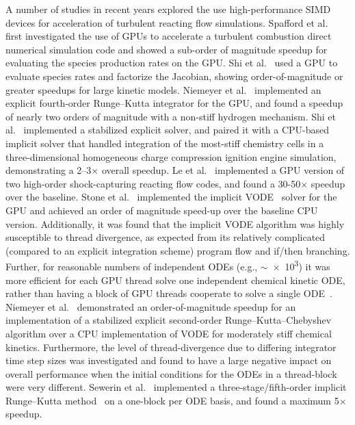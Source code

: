 \documentclass[preprint]{elsarticle}
\begin{document}
A number of studies in recent years explored the use high-performance SIMD devices for acceleration of turbulent reacting flow simulations.
Spafford et al.~\cite{Spafford:2010aa} first investigated the use of GPUs to accelerate a turbulent combustion direct numerical simulation code and showed a sub-order of magnitude speedup for evaluating the species production rates on the GPU.
Shi et al.~\cite{Shi:2011aa} used a GPU to evaluate species rates and factorize the Jacobian, showing order-of-magnitude or greater speedups for large kinetic models.
Niemeyer et al.~\cite{Niemeyer:2011aa} implemented an explicit fourth-order Runge--Kutta integrator for the GPU, and found a speedup of nearly two orders of magnitude with a non-stiff hydrogen mechanism.
Shi et al.~\cite{Shi:2012aa} implemented a stabilized explicit solver, and paired it with a CPU-based implicit solver that handled integration of the most-stiff chemistry cells in a three-dimensional homogeneous charge compression ignition engine simulation, demonstrating a 2--3$\times$ overall speedup.
Le et al.~\cite{Le2013596} implemented a GPU version of two high-order shock-capturing reacting flow codes, and found a 30-50$\times$ speedup over the baseline.
Stone et al.~\cite{Stone:2013aa} implemented the implicit VODE~\cite{brown1989vode} solver for the GPU and achieved an order of magnitude speed-up over the baseline CPU version.
Additionally, it was found that the implicit VODE algorithm was highly susceptible to thread divergence, as expected from its relatively complicated (compared to an explicit integration scheme) program flow and if/then branching.
Further, for reasonable numbers of independent ODEs (e.g., $\sim$\num{e3}) it was more efficient for each GPU thread solve one independent chemical kinetic ODE, rather than having a block of GPU threads cooperate to solve a single ODE~\cite{Stone:2013aa}.
Niemeyer et al.~\cite{Niemeyer:2014aa} demonstrated an order-of-magnitude speedup for an implementation of a stabilized explicit second-order Runge--Kutta--Chebyshev algorithm over a CPU implementation of VODE for moderately stiff chemical kinetics.
Furthermore, the level of thread-divergence due to differing integrator time step sizes was investigated and found to have a large negative impact on overall performance when the initial conditions for the ODEs in a thread-block were very different.
Sewerin et al.~\cite{Sewerin20151375} implemented a three-stage\slash fifth-order implicit Runge--Kutta method~\cite{hairer1996solving} on a one-block per ODE basis, and found a maximum 5$\times$ speedup.
\end{document}
